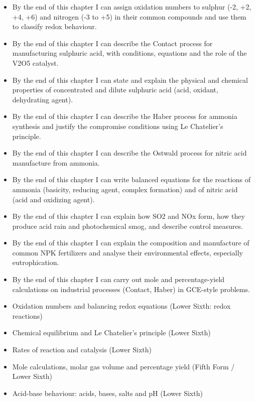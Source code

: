 \documentclass[11pt]{article}
\begin{document}
\begin{objectifs}
\begin{itemize}
\item By the end of this chapter I can assign oxidation numbers to sulphur (-2, +2, +4, +6) and nitrogen (-3 to +5) in their common compounds and use them to classify redox behaviour.
\item By the end of this chapter I can describe the Contact process for manufacturing sulphuric acid, with conditions, equations and the role of the V2O5 catalyst.
\item By the end of this chapter I can state and explain the physical and chemical properties of concentrated and dilute sulphuric acid (acid, oxidant, dehydrating agent).
\item By the end of this chapter I can describe the Haber process for ammonia synthesis and justify the compromise conditions using Le Chatelier's principle.
\item By the end of this chapter I can describe the Ostwald process for nitric acid manufacture from ammonia.
\item By the end of this chapter I can write balanced equations for the reactions of ammonia (basicity, reducing agent, complex formation) and of nitric acid (acid and oxidizing agent).
\item By the end of this chapter I can explain how SO2 and NOx form, how they produce acid rain and photochemical smog, and describe control measures.
\item By the end of this chapter I can explain the composition and manufacture of common NPK fertilizers and analyse their environmental effects, especially eutrophication.
\item By the end of this chapter I can carry out mole and percentage-yield calculations on industrial processes (Contact, Haber) in GCE-style problems.
\end{itemize}
\end{objectifs}

\begin{prerequis}
\begin{itemize}
\item Oxidation numbers and balancing redox equations (Lower Sixth: redox reactions)
\item Chemical equilibrium and Le Chatelier's principle (Lower Sixth)
\item Rates of reaction and catalysis (Lower Sixth)
\item Mole calculations, molar gas volume and percentage yield (Fifth Form / Lower Sixth)
\item Acid-base behaviour: acids, bases, salts and pH (Lower Sixth)
\end{itemize}
\end{prerequis}
\end{document}
